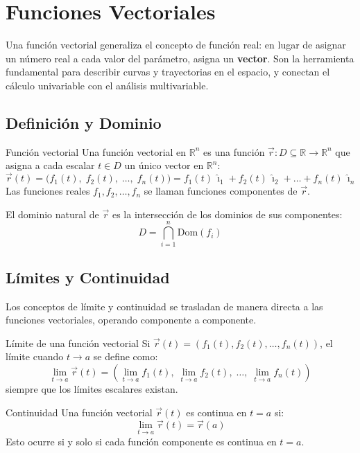 \section{Funciones Vectoriales}

Una función vectorial generaliza el concepto de función real: en lugar de asignar un número real a cada valor del parámetro, asigna un \textbf{vector}. Son la herramienta fundamental para describir curvas y trayectorias en el espacio, y conectan el cálculo univariable con el análisis multivariable.

\subsection{Definición y Dominio}

\begin{mydefinition}{Función vectorial}
Una función vectorial en $\mathbb{R}^n$ es una función $\vec{r}: D \subseteq \mathbb{R} \to \mathbb{R}^n$ que asigna a cada escalar $t \in D$ un único vector en $\mathbb{R}^n$:
\[ \vec{r}(t) = \bigl(f_1(t),\; f_2(t),\; \dots,\; f_n(t)\bigr) = f_1(t)\,\hat{\imath}_1 + f_2(t)\,\hat{\imath}_2 + \dots + f_n(t)\,\hat{\imath}_n \]
Las funciones reales $f_1, f_2, \dots, f_n$ se llaman funciones componentes de $\vec{r}$.
\end{mydefinition}

El dominio natural de $\vec{r}$ es la intersección de los dominios de sus componentes:
\[ D = \bigcap_{i=1}^{n} \text{Dom}(f_i) \]

\subsection{Límites y Continuidad}

Los conceptos de límite y continuidad se trasladan de manera directa a las funciones vectoriales, operando componente a componente.

\begin{mydefinition}{Límite de una función vectorial}
Si $\vec{r}(t) = (f_1(t), f_2(t), \dots, f_n(t))$, el límite cuando $t \to a$ se define como:
\[ \lim_{t \to a} \vec{r}(t) = \left(\lim_{t \to a} f_1(t),\; \lim_{t \to a} f_2(t),\; \dots,\; \lim_{t \to a} f_n(t)\right) \]
siempre que los límites escalares existan.
\end{mydefinition}

\begin{mydefinition}{Continuidad}
Una función vectorial $\vec{r}(t)$ es continua en $t = a$ si:
\[ \lim_{t \to a} \vec{r}(t) = \vec{r}(a) \]
Esto ocurre si y solo si cada función componente es continua en $t = a$.
\end{mydefinition}

